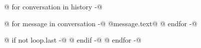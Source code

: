\documentclass[a4paper]{article}
\begin{document}
@{ for conversation in history -}@
\begin{dialogue}
@{ for message in conversation -}@
 @{{message.text}}@
@{ endfor -}@
\end{dialogue}
@{ if not loop.last -}@
\hrulefill
@{ endif -}@
@{ endfor -}@
\end{document}
